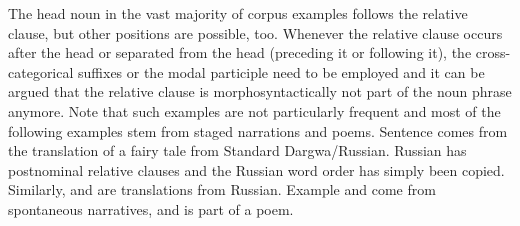 The head noun in the vast majority of corpus examples follows the relative clause, but other positions are possible, too. Whenever the relative clause occurs after the head or separated from the head (preceding it or following it), the cross-categorical suffixes or the modal participle need to be employed and it can be argued that the relative clause is morphosyntactically not part of the noun phrase anymore. Note that such examples are not particularly frequent and most of the following examples stem from staged narrations and poems. Sentence  comes from the translation of a fairy tale from Standard Dargwa\slash Russian.  Russian has postnominal relative clauses and the Russian word order has simply been copied. Similarly,  and  are translations from Russian. Example  and  come from spontaneous narratives, and  is part of a poem.
%
